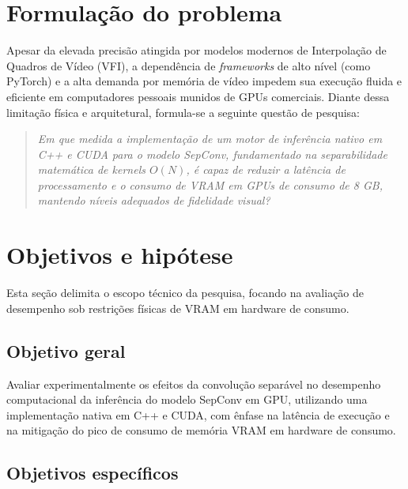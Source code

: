 \documentclass[
    12pt,                %
    openright,           %
    oneside,             %
    a4paper,             %
    english,             %
    brazil               %
]{abntex2}
\begin{document}

\section{Formulação do problema}
\label{sec:problema}

Apesar da elevada precisão atingida por modelos modernos de Interpolação de Quadros de Vídeo (VFI), a dependência de \textit{frameworks} de alto nível (como PyTorch) e a alta demanda por memória de vídeo impedem sua execução fluida e eficiente em computadores pessoais munidos de GPUs comerciais. Diante dessa limitação física e arquitetural, formula-se a seguinte questão de pesquisa:

\begin{quote}
\textit{Em que medida a implementação de um motor de inferência nativo em C++ e CUDA para o modelo SepConv, fundamentado na separabilidade matemática de \textit{kernels} $O(N)$, é capaz de reduzir a latência de processamento e o consumo de VRAM em GPUs de consumo de 8 GB, mantendo níveis adequados de fidelidade visual?}
\end{quote}

\section{Objetivos e hipótese}
\label{sec:objetivos}

Esta seção delimita o escopo técnico da pesquisa, focando na avaliação de desempenho sob restrições físicas de VRAM em hardware de consumo.

\subsection{Objetivo geral}

Avaliar experimentalmente os efeitos da convolução separável no desempenho computacional da inferência do modelo SepConv em GPU, utilizando uma implementação nativa em C++ e CUDA, com ênfase na latência de execução e na mitigação do pico de consumo de memória VRAM em hardware de consumo.

\subsection{Objetivos específicos}
\end{document}
